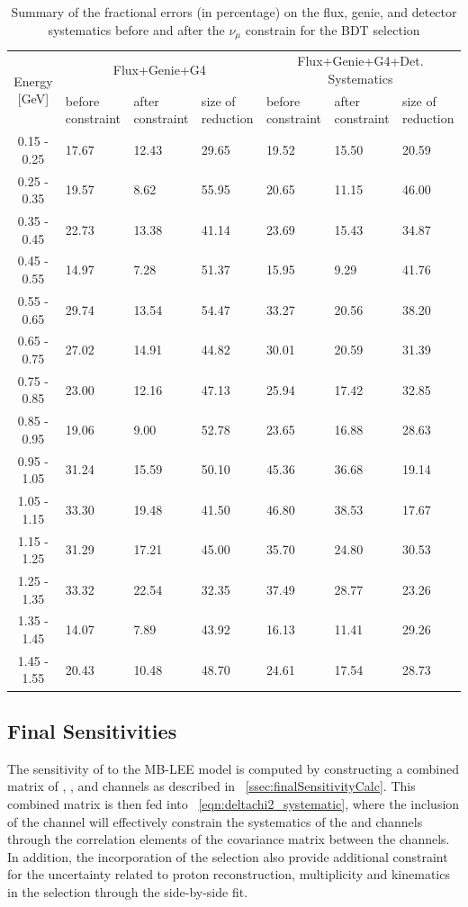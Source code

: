 \begin{table}[H]
\centering
\begin{tabular}{| c | m{1.65cm} | m{1.65cm} | m{1.65cm} | m{1.65cm} | m{1.65cm} | m{1.65cm}|}
\cline{1-7}
\multirow{2}{*}{Energy [GeV]} &\multicolumn{3}{c|}{Flux+Genie+G4}&\multicolumn{3}{c|}{Flux+Genie+G4+Det. Systematics}\\
\cline{2-7}
{} &  before constraint & after constraint  & size of reduction & before constraint & after constraint & size of reduction \\
\hline
0.15 - 0.25 & 17.67 & 12.43 & 29.65 & 19.52 & 15.50 & 20.59 \\
0.25 - 0.35 & 19.57 & 8.62 & 55.95 & 20.65 & 11.15 & 46.00 \\
0.35 - 0.45 & 22.73 & 13.38 & 41.14 & 23.69 & 15.43 & 34.87 \\
0.45 - 0.55 & 14.97 & 7.28 & 51.37 & 15.95 & 9.29 & 41.76 \\
0.55 - 0.65 & 29.74 & 13.54 & 54.47 & 33.27 & 20.56 & 38.20 \\
0.65 - 0.75 & 27.02 & 14.91 & 44.82 & 30.01 & 20.59 & 31.39 \\
0.75 - 0.85 & 23.00 & 12.16 & 47.13 & 25.94 & 17.42 & 32.85 \\
0.85 - 0.95 & 19.06 & 9.00 & 52.78 & 23.65 & 16.88 & 28.63 \\
0.95 - 1.05 & 31.24 & 15.59 & 50.10 & 45.36 & 36.68 & 19.14 \\
1.05 - 1.15 & 33.30 & 19.48 & 41.50 & 46.80 & 38.53 & 17.67 \\
1.15 - 1.25 & 31.29 & 17.21 & 45.00 & 35.70 & 24.80 & 30.53 \\
1.25 - 1.35 & 33.32 & 22.54 & 32.35 & 37.49 & 28.77 & 23.26 \\
1.35 - 1.45 & 14.07 & 7.89 & 43.92 & 16.13 & 11.41 & 29.26 \\
1.45 - 1.55 & 20.43 & 10.48 & 48.70 & 24.61 & 17.54 & 28.73 \\
\hline
\end{tabular}
\caption{Summary of the fractional errors (in percentage) on the flux, genie, and detector systematics before and after the $\nu_\mu$ constrain for the \zpsel BDT selection}
\label{tab:numu_1e0p_bdt_const}
\end{table}

\subsection{Final Sensitivities}

\par The sensitivity of to the MB-\nue LEE model is computed by constructing a combined matrix of \npsel, \zpsel, and \numu channels as described in ~\cref{ssec:finalSensitivityCalc}. This combined matrix is then fed into ~\cref{eqn:deltachi2_systematic}, where the inclusion of the \numu channel will effectively constrain the systematics of the \npsel and \zpsel channels through the correlation elements of the covariance matrix between the channels. In addition, the incorporation of the \zpsel selection also provide additional constraint for the uncertainty related to proton reconstruction, multiplicity and kinematics in the \npsel selection through the side-by-side fit.

